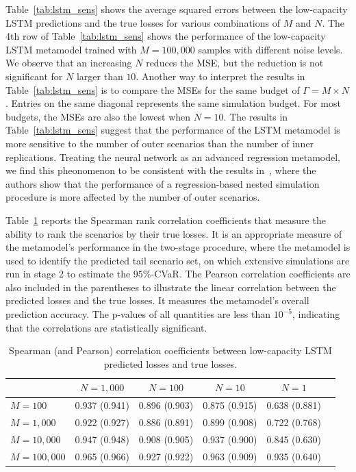 \documentclass{article}
\begin{document}
Table~\ref{tab:lstm_sens} shows the average squared errors between the low-capacity LSTM predictions and the true losses for various combinations of $M$ and $N$.
The 4th row of Table~\ref{tab:lstm_sens} shows the performance of the low-capacity LSTM metamodel trained with $M=100\!,000$ samples with different noise levels.
We observe that an increasing $N$ reduces the MSE, but the reduction is not significant for $N$ larger than $10$.
Another way to interpret the results in Table~\ref{tab:lstm_sens} is to compare the MSEs for the same budget of $\Gamma = M \times N$.
Entries on the same diagonal represents the same simulation budget.
For most budgets, the MSEs are also the lowest when $N = 10$.
The results in Table~\ref{tab:lstm_sens} suggest that the performance of the LSTM metamodel is more sensitive to the number of outer scenarios than the number of inner replications.
Treating the neural network as an advanced regression metamodel, we find this pheonomenon to be consistent with the results in~\cite{broadie2015risk}, where the authors show that the performance of a regression-based nested simulation procedure is more affected by the number of outer scenarios.

Table~\ref{tab:lstm_corr} reports the Spearman rank correlation coefficients that measure the ability to rank the scenarios by their true losses.
It is an appropriate measure of the metamodel's performance in the two-stage procedure, where the metamodel is used to identify the predicted tail scenario set, on which extensive simulations are run in stage 2 to estimate the $95\%$-CVaR.
The Pearson correlation coefficients are also included in the parentheses to illustrate the linear correlation between the predicted losses and the true losses.
It measures the metamodel's overall prediction accuracy.
The p-values of all quantities are less than $10^{-5}$, indicating that the correlations are statistically significant.

\begin{table}[ht!]
    \small
    \centering
    \begin{tabular}{lccccc}
        \toprule
                          & $N=1\!,\!000$ & $N=100$       & $N=10$        & $N=1$ \\
        \midrule
        $M = 100$         & 0.937 (0.941) & 0.896 (0.903) & 0.875 (0.915) & 0.638 (0.881) \\
        $M = 1\!,\!000$   & 0.922 (0.927) & 0.886 (0.891) & 0.899 (0.908) & 0.722 (0.768) \\
        $M = 10\!,\!000$  & 0.947 (0.948) & 0.908 (0.905) & 0.937 (0.900) & 0.845 (0.630) \\
        $M = 100\!,\!000$ & 0.965 (0.966) & 0.927 (0.922) & 0.963 (0.909) & 0.935 (0.640) \\
        \bottomrule
    \end{tabular}
    \caption{Spearman (and Pearson) correlation coefficients between low-capacity LSTM predicted losses and true losses.}
    \label{tab:lstm_corr}
\end{table}
\end{document}
